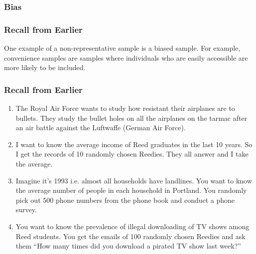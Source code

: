 \documentclass[handout]{beamer}
\newcommand{\blue}[1]{\textcolor{blue2}{#1}}
\newcommand{\E}{\mathbb{E}}
\begin{document}
\begin{frame}
\frametitle{Bias}
%
%

\end{frame}


\begin{frame}
\frametitle{Recall from Earlier}

One example of a non-representative sample is a \blue{biased sample}. For example, \blue{convenience samples} are samples where individuals who are easily accessible are more likely to be included.  

\end{frame}


\begin{frame}
\frametitle{Recall from Earlier}

\begin{small}
\begin{enumerate}
\item The Royal Air Force wants to study how resistant their airplanes are to bullets. They study the bullet holes on all the airplanes on the tarmac after an air battle against the Luftwaffe (German Air Force).
\item I want to know the average income of Reed graduates in the last 10 years.  So I get the records of 10 randomly chosen Reedies.  They all answer and I take the average.
\item Imagine it's 1993 i.e. almost all households have landlines.  You want to know the average number of people in each household in Portland.  You randomly pick out 500 phone numbers from the phone book and conduct a phone survey.
\item You want to know the prevalence of illegal downloading of TV shows among Reed students.  You get the emails of 100 randomly chosen Reedies and ask them ``How many times did you download a pirated TV show last week?''
\end{enumerate}
\end{small}

\end{frame}
\end{document}

